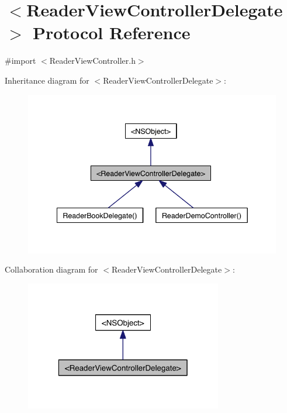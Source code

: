 \hypertarget{protocol_reader_view_controller_delegate-p}{\section{$<$Reader\-View\-Controller\-Delegate$>$ Protocol Reference}
\label{d7/dd9/protocol_reader_view_controller_delegate-p}
}


{\ttfamily \#import $<$Reader\-View\-Controller.\-h$>$}



Inheritance diagram for $<$Reader\-View\-Controller\-Delegate$>$\-:
\nopagebreak
\begin{figure}[H]
\begin{center}
\leavevmode
\includegraphics[width=341pt]{d7/d79/protocol_reader_view_controller_delegate-p__inherit__graph}
\end{center}
\end{figure}


Collaboration diagram for $<$Reader\-View\-Controller\-Delegate$>$\-:
\nopagebreak
\begin{figure}[H]
\begin{center}
\leavevmode
\includegraphics[width=244pt]{df/d34/protocol_reader_view_controller_delegate-p__coll__graph}
\end{center}
\end{figure}
